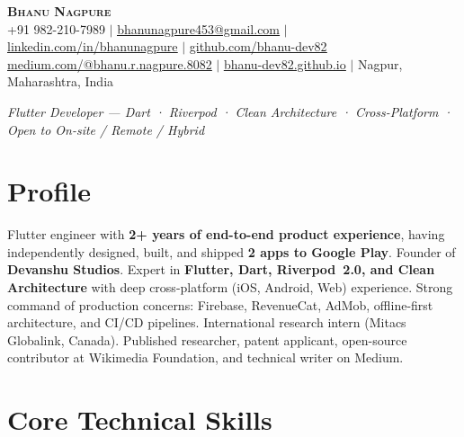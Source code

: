 \documentclass[letterpaper,11pt]{article}
\begin{document}
\begin{center}
    {\Huge\bfseries\scshape Bhanu Nagpure} \\[5pt]
    \small
    +91 982-210-7989 \;$|$\;
    \href{mailto:bhanunagpure453@gmail.com}{\underline{bhanunagpure453@gmail.com}} \;$|$\;
    \href{https://www.linkedin.com/in/bhanunagpure/}{\underline{linkedin.com/in/bhanunagpure}} \;$|$\;
    \href{https://github.com/bhanu-dev82}{\underline{github.com/bhanu-dev82}}
    \\[2pt]
    \href{https://medium.com/@bhanu.r.nagpure.8082}{\underline{medium.com/@bhanu.r.nagpure.8082}} \;$|$\;
    \href{https://bhanu-dev82.github.io}{\underline{bhanu-dev82.github.io}} \;$|$\;
    Nagpur, Maharashtra, India
\end{center}

\vspace{2pt}
\begin{center}
  \small\textit{Flutter Developer — Dart · Riverpod · Clean Architecture · Cross-Platform · Open to On-site / Remote / Hybrid}
\end{center}

\vspace{4pt}

\section{Profile}

\small{Flutter engineer with \textbf{2+ years of end-to-end product experience}, having independently designed, built, and shipped \textbf{2 apps to Google Play}. Founder of \textbf{Devanshu Studios}. Expert in \textbf{Flutter, Dart, Riverpod~2.0, and Clean Architecture} with deep cross-platform (iOS, Android, Web) experience. Strong command of production concerns: Firebase, RevenueCat, AdMob, offline-first architecture, and CI/CD pipelines. International research intern (Mitacs Globalink, Canada). Published researcher, patent applicant, open-source contributor at Wikimedia Foundation, and technical writer on Medium.}

\section{Core Technical Skills}
\end{document}
